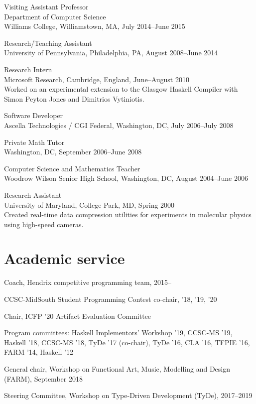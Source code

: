 \documentclass[12pt]{article}
\newcommand{\cvitem}{\par\hangpara{2em}{1}}
\begin{document}
\cvitem
Visiting Assistant Professor \\
Department of Computer Science \\
Williams College, Williamstown, MA, July 2014--June 2015

\cvitem
Research/Teaching Assistant \\
University of Pennsylvania, Philadelphia, PA, August 2008--June 2014

\cvitem
Research Intern \\
Microsoft Research, Cambridge, England, June--August 2010 \\
Worked on an experimental extension to the Glasgow Haskell Compiler with
Simon Peyton Jones and Dimitrios Vytiniotis.

\cvitem
Software Developer \\
Ascella Technologies / CGI Federal, Washington,
DC, July 2006--July 2008

\cvitem
Private Math Tutor \\
Washington, DC, September 2006--June 2008

\cvitem
Computer Science and Mathematics Teacher \\
Woodrow Wilson Senior High School, Washington, DC, August 2004--June 2006

\cvitem
Research Assistant \\
University of Maryland, College Park, MD, Spring 2000 \\
Created real-time data compression utilities for experiments in
molecular physics using high-speed cameras.

\section*{Academic service}

\cvitem Coach, Hendrix competitive programming team, 2015--

\cvitem CCSC-MidSouth Student Programming Contest co-chair, '18, '19, '20

\cvitem Chair, ICFP '20 Artifact Evaluation Committee

\cvitem Program committees: Haskell Implementors' Workshop '19,
CCSC-MS '19, Haskell '18, CCSC-MS '18, TyDe '17 (co-chair), TyDe '16,
CLA '16, TFPIE '16, FARM '14, Haskell '12

\cvitem General chair, Workshop on Functional Art, Music, Modelling
and Design (FARM), September 2018

\cvitem Steering Committee, Workshop on Type-Driven Development
(TyDe), 2017--2019
\end{document}
